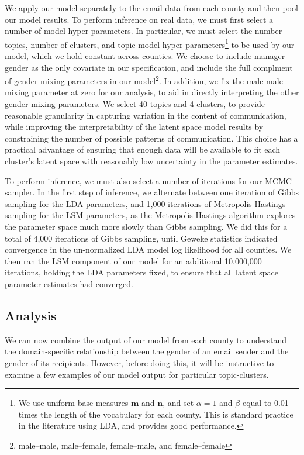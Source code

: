 \documentclass{pnastwo}
\begin{document}
\begin{article}
We apply our model separately to the email data from each county and then pool our model results. To perform inference on real data, we must first select a number of model hyper-parameters. In particular, we must select the number topics, number of clusters, and topic model hyper-parameters\footnote{We use uniform base measures $\mathbf{m}$ and $\mathbf{n}$, and set $\alpha = 1$ and $\beta$ equal to 0.01 times the length of the vocabulary for each county. This is standard practice in the literature using LDA, and provides good performance.} to be used by our model, which we hold constant across counties. We choose to include manager gender as the only covariate in our specification, and include the full complment of gender mixing parameters in our model\footnote{male--male, male--female, female--male, and female--female}. In addition, we fix the male-male mixing parameter at zero for our analysis, to aid in directly interpreting the other gender mixing parameters. We select 40 topics and 4 clusters, to provide reasonable granularity in capturing variation in the content of communication, while improving the interpretability of the latent space model results by constraining the number of possible patterns of communication. This choice has a practical advantage of ensuring that enough data will be available to fit each cluster’s latent space with reasonably low uncertainty in the parameter estimates.

To perform inference, we must also select a number of iterations for our MCMC sampler. In the first step of inference, we alternate between one iteration of Gibbs sampling for the LDA parameters, and 1,000 iterations of Metropolis Hastings sampling for the LSM parameters, as the Metropolis Hastings algorithm explores the parameter space much more slowly than Gibbs sampling. We did this for a total of 4,000 iterations of Gibbs sampling, until Geweke statistics indicated convergence in the un-normalized LDA model log likelihood for all counties. We then ran the LSM component of our model for an additional 10,000,000 iterations, holding the LDA parameters fixed, to ensure that all latent space parameter estimates had converged.


\subsection{Analysis}
We can now combine the output of our model from each county to understand the domain-specific relationship between the gender of an email sender and the gender of its recipients. However, before doing this, it will be instructive to examine a few examples of our model output for particular topic-clusters. 


\end{article}
\end{document}
